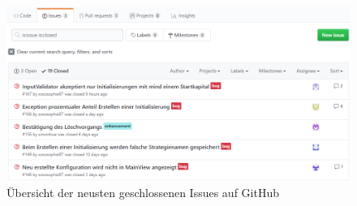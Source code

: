 \begin{figure}[H]
	\centering
	\includegraphics[width=1.1\textwidth]{qs_1.png}
	\caption{Übersicht der neusten geschlossenen Issues auf GitHub}
\end{figure}